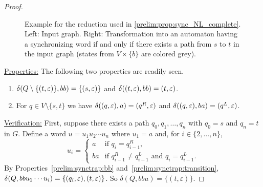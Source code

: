 \begin{proof}
\begin{figure}[thb]
\begin{minipage}[c]{0.64\textwidth}
			\end{minipage}
			\caption[Example for reduction used in the proof of Prop.~\ref{prelim:prop:sync_NL_complete}]{Example for the reduction used in \cref{prelim:prop:sync_NL_complete}. Left: Input graph. Right: Transformation into an automaton having a synchronizing word if and only if there exists a path from $s$ to $t$ in the input graph (states from $V \times \{b\}$ are colored grey).}
			\label{prelim:fig:sync_NL_hard}
		\end{figure}
	
	\medskip 
	\noindent\underline{Properties:} The following two properties are readily seen.
	\begin{enumerate}
		\item \label{prelim:synctrap:bb} 
		$\delta(Q \setminus \{(t,\varepsilon)\},bb) = \{(s,\varepsilon)\}$
		and  $\delta((t, \varepsilon),bb) = (t,\varepsilon)$.		
		
		\item \label{prelim:synctrap:transition} For $q \in V \setminus \{s,t\}$ 
		we have $\delta((q, \varepsilon),a) = (q^R,\varepsilon)$
		and $\delta((q, \varepsilon),ba) = (q^L,\varepsilon)$.
	\end{enumerate}
	
	\medskip 
	\noindent\underline{Verification:} First, suppose there exists a path $q_0, q_1, \ldots, q_n$
	with $q_0 = s$ and $q_n = t$ in $G$.
	Define a word $u = u_1 u_2 \cdots u_n$ 
	where $u_1 = a$ and, for $i \in \{2,\ldots,n\}$, 
	\[
	u_i = \begin{cases}
		a   & \text{if } q_i = q_{i-1}^R, \\
		ba	& \text{if } q_{i-1}^R \ne q_{i-1}^L \text{ and } q_i = q_{i-1}^L. 	
	\end{cases}
	\]	
	By Properties~\ref{prelim:synctrap:bb} and~\ref{prelim:synctrap:transition}, 
	$\delta(Q,bbu_1 \cdots u_i) = \{ (q_i,\varepsilon), (t,\varepsilon) \}$.
	So $\delta(Q,bbu) = \{(t,\varepsilon)\}$.		
	

\end{proof}
